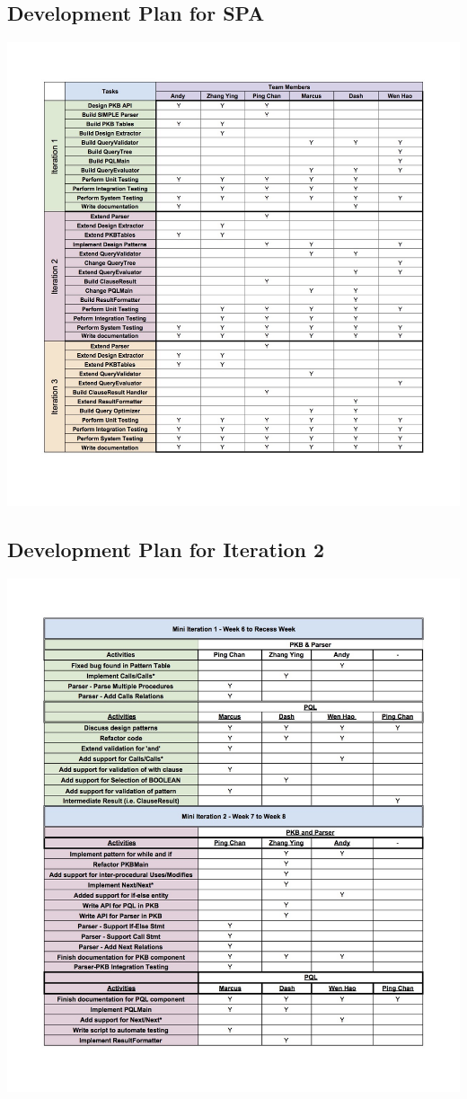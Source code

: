 \documentclass[12pt]{article}
\begin{document}
\subsection{Development Plan for SPA}
\includegraphics[width = 1.4\textwidth,center]{DevPlan.jpg}
\subsection{Development Plan for Iteration 2}
\includegraphics[width = 1.2\textwidth,center]{Iteration2.jpg}
\end{document}
